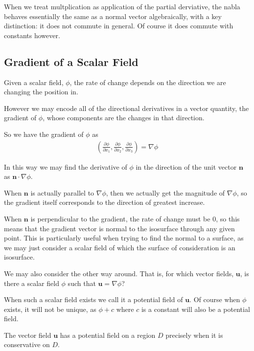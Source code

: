 \documentclass[]{article}
\begin{document}
When we treat multplication as application of the partial derviative, the nabla behaves essentially the same as a normal vector algebraically, with a key distinction: it does not commute in general. Of course it does commute with constants however.

\subsection{Gradient of a Scalar Field}

Given a scalar field, $\phi$, the rate of change depends on the direction we are changing the position in. 

However we may encode all of the directional derivatives in a vector quantity, the gradient of $\phi$, whose components are the changes in that direction. 

So we have the gradient of $\phi$ as 
\begin{align*}
		\left(\frac{\partial \phi}{\partial x_1}, \frac{\partial \phi}{\partial x_2}, \frac{\partial \phi}{\partial x_3}\right) = \nabla \phi
\end{align*}

In this way we may find the derivative of $\phi$ in the direction of the unit vector $\mathbf{n}$ as $\mathbf{n} \cdot \nabla \phi$. 

When $\mathbf{n}$ is actually parallel to $\nabla \phi$, then we actually get the magnitude of $\nabla \phi$, so the gradient itself corresponds to the direction of greatest increase.

When $\mathbf{n}$ is perpendicular to the gradient, the rate of change must be $0$, so this means that the gradient vector is normal to the isosurface through any given point. This is particularly useful when trying to find the normal to a surface, as we may just consider a scalar field of which the surface of consideration is an isosurface.

We may also consider the other way around. That is, for which vector fields, $\mathbf{u}$, is there a scalar field $\phi$ such that $\mathbf{u} = \nabla \phi$? 

When such a scalar field exists we call it a potential field of $\mathbf{u}$. Of course when $\phi$ exists, it will not be unique, as $\phi + c$  where $c$ is a constant will also be a potential field.

\begin{thm}
		The vector field $\mathbf{u}$ has a potential field on a region $D$ precisely when it is conservative on $D$.
\end{thm}
\end{document}
